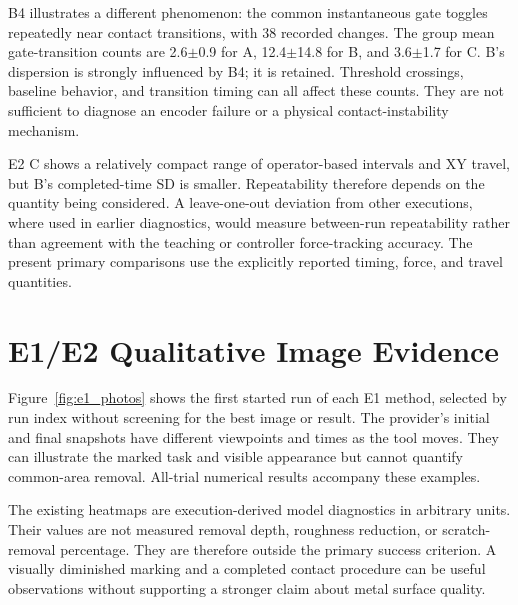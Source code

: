 B4 illustrates a different phenomenon: the common instantaneous gate toggles repeatedly near contact transitions, with 38 recorded changes. The group mean gate-transition counts are 2.6\(\pm\)0.9 for A, 12.4\(\pm\)14.8 for B, and 3.6\(\pm\)1.7 for C. B's dispersion is strongly influenced by B4; it is retained. Threshold crossings, baseline behavior, and transition timing can all affect these counts. They are not sufficient to diagnose an encoder failure or a physical contact-instability mechanism.

E2 C shows a relatively compact range of operator-based intervals and XY travel, but B's completed-time SD is smaller. Repeatability therefore depends on the quantity being considered. A leave-one-out deviation from other executions, where used in earlier diagnostics, would measure between-run repeatability rather than agreement with the teaching or controller force-tracking accuracy. The present primary comparisons use the explicitly reported timing, force, and travel quantities.

\section{E1/E2 Qualitative Image Evidence}
Figure~\ref{fig:e1_photos} shows the first started run of each E1 method, selected by run index without screening for the best image or result. The provider's initial and final snapshots have different viewpoints and times as the tool moves. They can illustrate the marked task and visible appearance but cannot quantify common-area removal. All-trial numerical results accompany these examples.



The existing heatmaps are execution-derived model diagnostics in arbitrary units. Their values are not measured removal depth, roughness reduction, or scratch-removal percentage. They are therefore outside the primary success criterion. A visually diminished marking and a completed contact procedure can be useful observations without supporting a stronger claim about metal surface quality.

